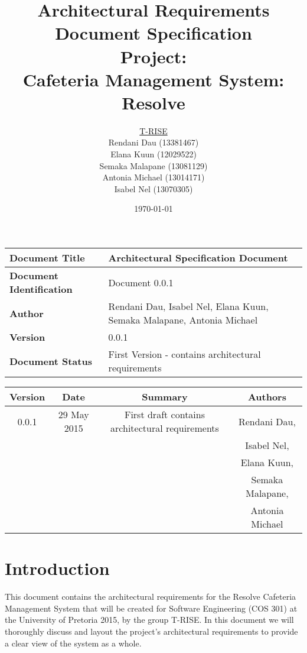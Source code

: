 \documentclass[a4paper,12pt]{article}
\title{\Huge Architectural Requirements Document Specification \\ 
	 Project: \\ 
	Cafeteria Management System: Resolve}
\author{
         \underline{T-RISE}\\
          Rendani Dau (13381467) \\
	Elana Kuun (12029522) \\
	Semaka Malapane (13081129) \\
	Antonia Michael (13014171) \\
	Isabel Nel (13070305)}
\date{\today}
\begin{document}
\maketitle
\break

\tableofcontents
\break

 \begin{tabu} to 0.8\textwidth { | X[l] | X[l] | }
 \hline
 \textbf{Document Title} & Architectural Specification Document \\
 \hline
 \textbf{Document Identification}  & Document 0.0.1  \\
 \hline
 \textbf{Author}  & Rendani Dau, Isabel Nel, Elana Kuun, Semaka Malapane, Antonia Michael \\
 \hline
 \textbf{Version} & 0.0.1 \\
 \hline
 \textbf{Document Status} & First Version - contains architectural requirements  \\
 \hline
 \end{tabu}

\begin{table}[h!]
\centering
 \begin{tabular}{||c c c c||} 
 \hline
 \textbf{Version} & \textbf{Date} & \textbf{Summary} & \textbf{Authors} \\ [0.5ex] 
 \hline\hline
 0.0.1 & 29 May 2015 & First draft contains architectural requirements & Rendani Dau, \\ & & & Isabel Nel, \\ & & & Elana Kuun, \\ & & & Semaka Malapane, \\ & & & Antonia Michael \\   [1ex] 
 \hline
 \end{tabular}
\end{table}

\pagebreak


\section{Introduction}
This document contains the architectural requirements for the Resolve Cafeteria Management System that will be created for Software Engineering (COS 301) at the University of Pretoria 2015, by the group T-RISE. In this document we will thoroughly discuss and layout the project's architectural requirements to provide a clear view of the system as a whole.  
\end{document}
